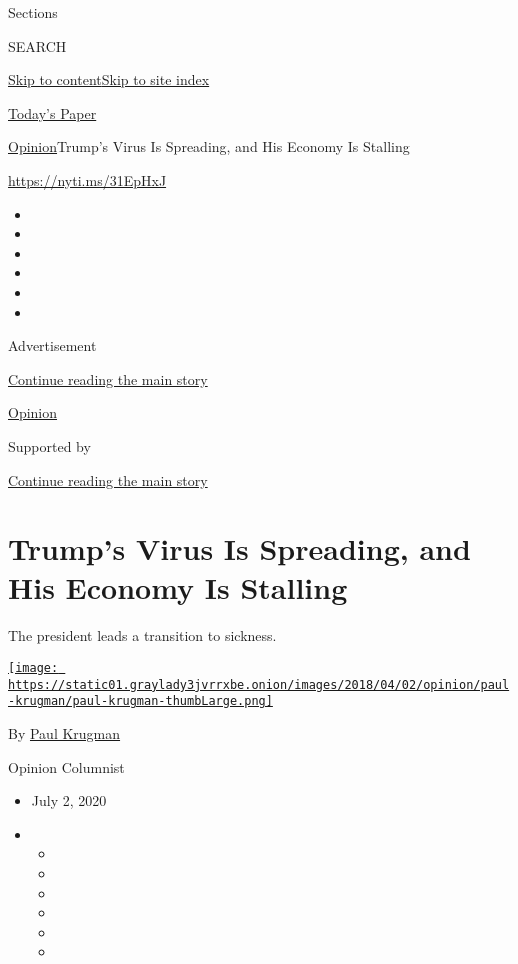 Sections

SEARCH

\protect\hyperlink{site-content}{Skip to
content}\protect\hyperlink{site-index}{Skip to site index}

\href{https://myaccount.nytimes3xbfgragh.onion/auth/login?response_type=cookie\&client_id=vi}{}

\href{https://www.nytimes3xbfgragh.onion/section/todayspaper}{Today's
Paper}

\href{/section/opinion}{Opinion}\textbar{}Trump's Virus Is Spreading,
and His Economy Is Stalling

\url{https://nyti.ms/31EpHxJ}

\begin{itemize}
\item
\item
\item
\item
\item
\item
\end{itemize}

Advertisement

\protect\hyperlink{after-top}{Continue reading the main story}

\href{/section/opinion}{Opinion}

Supported by

\protect\hyperlink{after-sponsor}{Continue reading the main story}

\hypertarget{trumps-virus-is-spreading-and-his-economy-is-stalling}{%
\section{Trump's Virus Is Spreading, and His Economy Is
Stalling}\label{trumps-virus-is-spreading-and-his-economy-is-stalling}}

The president leads a transition to sickness.

\href{https://www.nytimes3xbfgragh.onion/by/paul-krugman}{\texttt{[image: https://static01.graylady3jvrrxbe.onion/images/2018/04/02/opinion/paul-krugman/paul-krugman-thumbLarge.png]}}

By \href{https://www.nytimes3xbfgragh.onion/by/paul-krugman}{Paul
Krugman}

Opinion Columnist

\begin{itemize}
\item
  July 2, 2020
\item
  \begin{itemize}
  \item
  \item
  \item
  \item
  \item
  \item
  \end{itemize}
\end{itemize}

